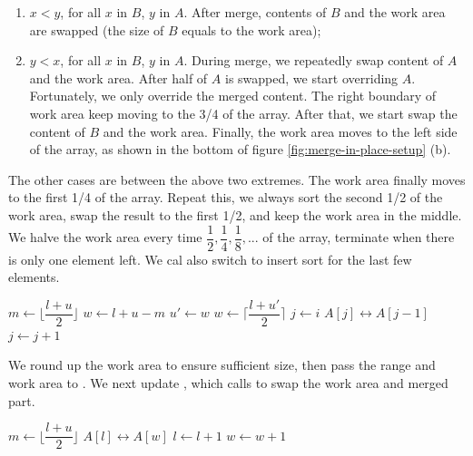 \documentclass[b5paper]{article}
\begin{document}
\begin{enumerate}
\item $x < y$, for all $x$ in $B$, $y$ in $A$. After merge, contents of $B$ and the work area are swapped (the size of $B$ equals to the work area);
\item $y < x$, for all $x$ in $B$, $y$ in $A$. During merge, we repeatedly swap content of $A$ and the work area. After half of $A$ is swapped, we start overriding $A$. Fortunately, we only override the merged content. The right boundary of work area keep moving to the 3/4 of the array. After that, we start swap the content of $B$ and the work area. Finally, the work area moves to the left side of the array, as shown in the bottom of figure \ref{fig:merge-in-place-setup} (b).
\end{enumerate}

The other cases are between the above two extremes. The work area finally moves to the first 1/4 of the array. Repeat this, we always sort the second 1/2 of the work area, swap the result to the first 1/2, and keep the work area in the middle. We halve the work area every time $\dfrac{1}{2}, \dfrac{1}{4}, \dfrac{1}{8}, ...$ of the array, terminate when there is only one element left. We cal also switch to insert sort for the last few elements.

\begin{algorithmic}[1]
    \State $m \gets \lfloor \dfrac{l + u}{2} \rfloor$
    \State $w \gets l + u - m$
    \State {} 
      \State $u' \gets w$
      \State $w \gets \lceil \dfrac{l + u'}{2} \rceil$ 
      \State {} 
      \State {}
    \EndWhile
     
      \State $j \gets i$
        \State {} $A[j] \leftrightarrow A[j-1]$
        \State $j \gets j + 1$
      \EndWhile
    \EndFor
  \EndIf
\EndProcedure
\end{algorithmic}

We round up the work area to ensure sufficient size, then pass the range and work area to . We next update , which calls  to swap the work area and merged part.

\begin{algorithmic}[1]
    \State $m \gets \lfloor \dfrac{l + u}{2} \rfloor$
    \State {}
    \State {}
    \State \Call{Merge}{$A, [l, m), [m+1, u), w$}
  \Else {}
      \State {} $A[l] \leftrightarrow A[w]$
      \State $l \gets l + 1$
      \State $w \gets w + 1$
    \EndWhile
  \EndIf
\EndProcedure
\end{algorithmic}
\end{document}
